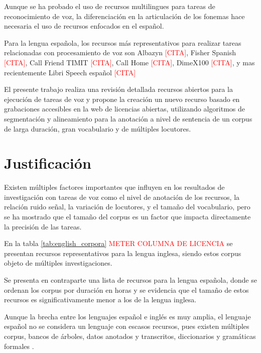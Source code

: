 \documentclass[a4paper,12pt,twoside]{report}
\begin{document}
Aunque se ha probado el uso de recursos multilingues para tareas de reconocimiento de voz, la diferenciación en la articulación de los fonemas hace necesaria el uso de recursos enfocados en el español.

Para la lengua española, los recursos más representativos para realizar tareas relacionadas con procesamiento de voz son Albazyn \textcolor{red}{[CITA]}, Fisher Spanish \textcolor{red}{[CITA]}, Call Friend TIMIT \textcolor{red}{[CITA]}, Call Home \textcolor{red}{[CITA]}, DimeX100 \textcolor{red}{[CITA]}, y mas recientemente Libri Speech español \textcolor{red}{[CITA]}

El presente trabajo realiza una revisión detallada recursos abiertos para la ejecución de tareas de voz y propone la creación un nuevo recurso basado en grabaciones accesibles en la web de licencias abiertas, utilizando algoritmos de segmentación y alineamiento para la anotación a nivel de sentencia de un corpus de larga duración, gran vocabulario y de múltiples locutores.


\section{Justificación}


Existen múltiples factores importantes que influyen en los resultados de investigación con tareas de voz como el nivel de anotación de los recursos, la relación ruido señal, la variación de locutores, y el tamaño del vocabulario, pero se ha mostrado que el tamaño del corpus es un factor que impacta directamente la precisión de las tareas.

En la tabla \ref{tab:english_corpora} \textcolor{red}{METER COLUMNA DE LICENCIA} se presentan recursos representativos para la lengua inglesa, siendo estos corpus objeto de múltiples investigaciones.



Se presenta en contraparte una lista de recursos para la lengua española, donde se ordenan los corpus por duración en horas y se evidencia que el tamaño de estos recursos es significativamente  menor a los de la lengua inglesa.




Aunque la brecha entre los lenguajes español e inglés es muy amplia, el lenguaje español no se considera un lenguaje con escasos recursos, pues existen múltiples corpus, bancos de árboles, datos anotados y transcritos, diccionarios y gramáticas formales \cite{CavarGlobalGORILLA}. 
\end{document}

